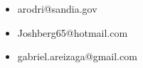 \documentclass[subfiles]{../main.tex}
\begin{document}
\begin{itemize}
\item {}arodri@sandia.gov
\item {}Joshberg65@hotmail.com
\item {}gabriel.areizaga@gmail.com
\end{itemize}
\end{document}
